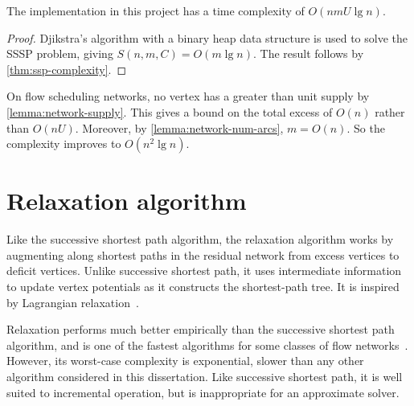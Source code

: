 \begin{cor}
The implementation in this project has a time complexity of $O(nmU \lg n)$.
\end{cor}
\begin{proof}
Djikstra's algorithm with a binary heap data structure is used to solve the SSSP problem, giving $S(n,m,C) = O(m \lg n)$. The result follows by \cref{thm:ssp-complexity}.
\end{proof}

\begin{remark}
On flow scheduling networks, no vertex has a greater than unit supply by \cref{lemma:network-supply}. This gives a bound on the total excess of $O(n)$ rather than $O(nU)$. Moreover, by \cref{lemma:network-num-arcs}, $m = O(n)$. So the complexity improves to $O(n^2 \lg n)$.
\end{remark}

\section{Relaxation algorithm} \label{sec:impl-relax}


Like the successive shortest path algorithm, the relaxation algorithm works by augmenting along shortest paths in the residual network from excess vertices to deficit vertices. Unlike successive shortest path, it uses intermediate information to update vertex potentials as it constructs the shortest-path tree. It is inspired by Lagrangian relaxation~\cite[ch.~16]{Ahuja:1993}\cite{Fisher:1981}.

Relaxation performs much better empirically than the successive shortest path algorithm, and is one of the fastest algorithms for some classes of flow networks~\cite{KiralyKovacs:2012}. However, its worst-case complexity is exponential, slower than any other algorithm considered in this dissertation\footnotemark. Like successive shortest path, it is well suited to incremental operation, but is inappropriate for an approximate solver.

